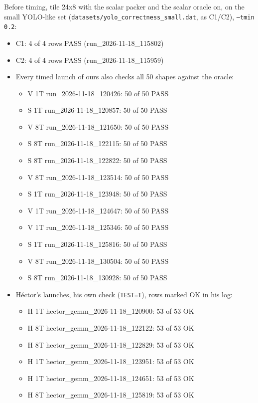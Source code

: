 Before timing, tile 24x8 with the scalar packer and the scalar oracle on, on the small YOLO-like set (\texttt{datasets/yolo\_correctness\_small.dat}, as  C1/C2), \texttt{--tmin 0.2}:
\begin{itemize}\setlength\itemsep{0pt}
\item C1: 4 of 4 rows PASS (run\_2026-11-18\_115802)
\item C2: 4 of 4 rows PASS (run\_2026-11-18\_115959)
\item Every timed launch of ours also checks all 50 shapes against the oracle:
\begin{itemize}\setlength\itemsep{0pt}\footnotesize
\item V 1T run\_2026-11-18\_120426: 50 of 50 PASS
\item S 1T run\_2026-11-18\_120857: 50 of 50 PASS
\item V 8T run\_2026-11-18\_121650: 50 of 50 PASS
\item S 8T run\_2026-11-18\_122115: 50 of 50 PASS
\item S 8T run\_2026-11-18\_122822: 50 of 50 PASS
\item V 8T run\_2026-11-18\_123514: 50 of 50 PASS
\item S 1T run\_2026-11-18\_123948: 50 of 50 PASS
\item V 1T run\_2026-11-18\_124647: 50 of 50 PASS
\item V 1T run\_2026-11-18\_125346: 50 of 50 PASS
\item S 1T run\_2026-11-18\_125816: 50 of 50 PASS
\item V 8T run\_2026-11-18\_130504: 50 of 50 PASS
\item S 8T run\_2026-11-18\_130928: 50 of 50 PASS
\end{itemize}
\item H\'ector's launches, his own check (\texttt{TEST=T}), rows marked OK in his log:
\begin{itemize}\setlength\itemsep{0pt}\footnotesize
\item H 1T hector\_gemm\_2026-11-18\_120900: 53 of 53 OK
\item H 8T hector\_gemm\_2026-11-18\_122122: 53 of 53 OK
\item H 8T hector\_gemm\_2026-11-18\_122829: 53 of 53 OK
\item H 1T hector\_gemm\_2026-11-18\_123951: 53 of 53 OK
\item H 1T hector\_gemm\_2026-11-18\_124651: 53 of 53 OK
\item H 8T hector\_gemm\_2026-11-18\_125819: 53 of 53 OK
\end{itemize}
\end{itemize}
